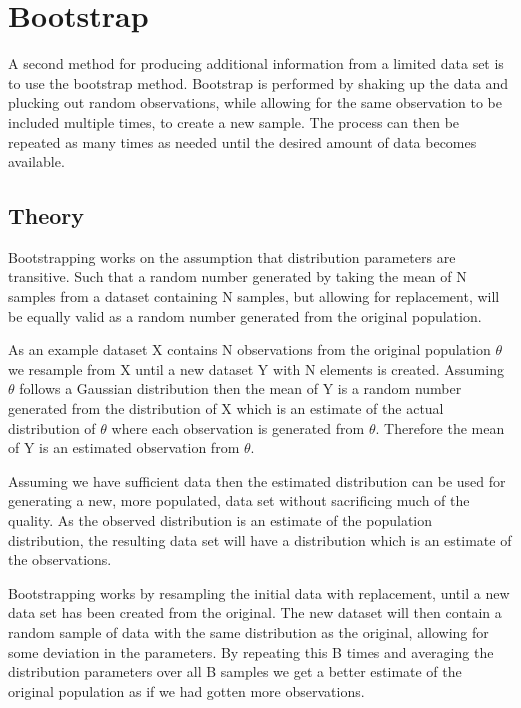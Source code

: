 \section{Bootstrap}\label{ch:bootstrap}

A second method for producing additional information from a limited data set is to use the bootstrap method. Bootstrap is performed by shaking up the data and plucking out random observations, while allowing for the same observation to be included multiple times, to create a new sample. The process can then be repeated as many times as needed until the desired amount of data becomes available. 

\subsection{Theory}%

\iffalse
A good explanation https://stats.stackexchange.com/questions/26088/explaining-to-laypeople-why-bootstrapping-works
\fi

Bootstrapping works on the assumption that distribution parameters are transitive. Such that a random number generated by taking the mean of N samples from a dataset containing N samples, but allowing for replacement, will be equally valid as a random number generated from the original population.

As an example dataset X contains N observations from the original population $\theta$ we resample from X until a new dataset Y with N elements is created. Assuming $\theta$ follows a Gaussian distribution then the mean of Y is a random number generated from the distribution of X which is an estimate of the actual distribution of $\theta$ where each observation is generated from $\theta$. Therefore the mean of Y is an estimated observation from $\theta$.

Assuming we have sufficient data then the estimated distribution can be used for generating a new, more populated, data set without sacrificing much of the quality. As the observed distribution is an estimate of the population distribution, the resulting data set will have a distribution which is an estimate of the observations.

\iffalse %
Bootstrapping works by resampling the initial data with replacement, until a new data set has been created from the original. The new dataset will then contain a random sample of data with the same distribution as the original, allowing for some deviation in the parameters. By repeating this B times and averaging the distribution parameters over all B samples we get a better estimate of the original population as if we had gotten more observations.

